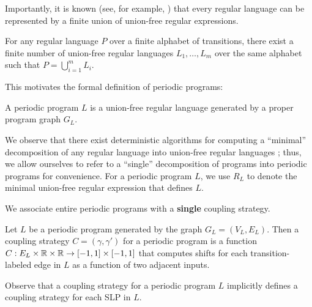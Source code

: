 Importantly, it is known (see, for example, \cite{afoninMinimalUnionFreeDecompositions2009}) that every regular language can be represented by a finite union of union-free regular expressions. 

\begin{cor}
    For any regular language $P$ over a finite alphabet of transitions, there exist a finite number of union-free regular languages $L_1,\ldots, L_m$ over the same alphabet such that $P = \bigcup_{i=1}^m L_i$.
\end{cor}

This motivates the formal definition of periodic programs:

\begin{defn}
    A periodic program $L$ is a union-free regular language generated by a proper program graph $G_L$.
\end{defn}

We observe that there exist deterministic algorithms for computing a ``minimal'' decomposition of any regular language into union-free regular languages \cite{afoninMinimalUnionFreeDecompositions2009}; thus, we allow ourselves to refer to a ``single'' decomposition of programs into periodic programs for convenience. 
For a periodic program $L$, we use $R_L$ to denote the minimal union-free regular expression that defines $L$.


We associate entire periodic programs with a \textbf{single} coupling strategy.

\begin{defn}
    Let $L$ be a periodic program generated by the graph $G_L = (V_L, E_L)$. Then a coupling strategy $C = (\gamma, \gamma')$ for a periodic program is a function $C:E_L\times\mathbb{R} \times\mathbb{R}\to [-1, 1]\times[-1, 1]$ that computes shifts for each transition-labeled edge in $L$ as a function of two adjacent inputs.
\end{defn}

Observe that a coupling strategy for a periodic program $L$ implicitly defines a coupling strategy for each SLP in $L$. 

